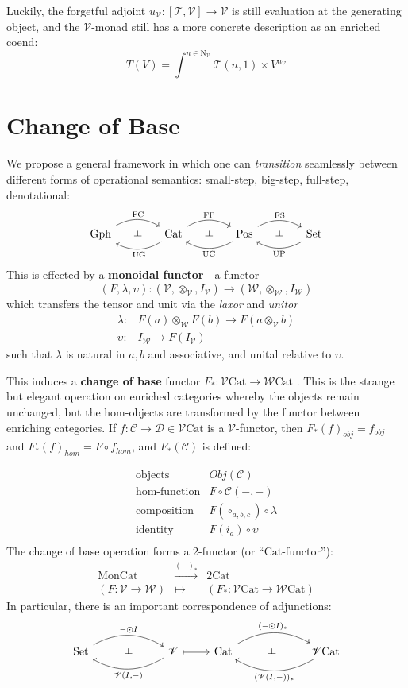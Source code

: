 \documentclass[a4paper,UKenglish]{article}
\theoremstyle{definition}
\def\ld{\rotatebox[origin=c]{-90}{$\dashv$}} %
\newcommand{\Gph}{\mathrm{Gph}}
\newcommand{\Set}{\mathrm{Set}}
\newcommand{\Cat}{\mathrm{Cat}}
\newcommand{\Mon}{\mathrm{Mon}}
\newcommand{\Pos}{\mathrm{Pos}}
\newcommand{\FC}{\mathrm{FC}}
\newcommand{\FP}{\mathrm{FP}}
\newcommand{\FS}{\mathrm{FS}}
\newcommand{\UC}{\mathrm{UC}}
\newcommand{\UP}{\mathrm{UP}}
\newcommand{\UG}{\mathrm{UG}}
\newcommand{\NN}{\mathrm{N}}
\newcommand{\V}{\mathscr{V}}
\newcommand{\W}{\mathscr{W}}
\newcommand{\D}{\mathscr{D}}
\newcommand{\C}{\mathscr{C}}
\newcommand{\T}{\mathscr{T}}
\begin{document}
Luckily, the forgetful adjoint $u_\V: [\T,\V] \to \V$ is still evaluation at the generating object, and the $\V$-monad still has a more concrete description as an enriched coend: $$T(V) = \int^{n\in \NN_\V} \T(n,1) \times V^{n_\V}$$

\section{Change of Base}

We propose a general framework in which one can \textit{transition} seamlessly between different forms of operational semantics: small-step, big-step, full-step, denotational:
\[\begin{tikzcd}[column sep=small]
\Gph \arrow[bend left,below]{rr}{\FC}
& \ld &
\arrow[bend left,above]{ll}{\UG} \Cat \arrow[bend left,below]{rr}{\FP}
& \ld &
\arrow[bend left,above]{ll}{\UC} \Pos \arrow[bend left,below]{rr}{\FS}
& \ld &
\Set \arrow[bend left,above]{ll}{\UP}
\end{tikzcd}\]
This is effected by a \textbf{monoidal functor} - a functor $$(F,\lambda,\upsilon): (\V,\otimes_\V,I_\V) \to (\W,\otimes_\W,I_\W)$$ which transfers the tensor and unit via the \textit{laxor} and \textit{unitor}
\[\begin{array}{rl}
\lambda: & F(a) \otimes_\W F(b) \to F(a\otimes_\V b)\\
\upsilon: & I_\W \to F(I_\V)
\end{array}\]
such that $\lambda$ is natural in $a,b$ and associative, and unital relative to $\upsilon$.

This induces a \textbf{change of base} functor $F_*:\V\Cat \to \W\Cat$ \cite{borceux}. This is the strange but elegant operation on enriched categories whereby the objects remain unchanged, but the hom-objects are transformed by the functor between enriching categories. If $f: \C \to \D \in \V\Cat$ is a $\V$-functor, then $F_*(f)_{obj} = f_{obj}$ and $F_*(f)_{hom} = F\circ f_{hom}$, and $F_*(\C)$ is defined:

\[\begin{array}{rl}
\text{objects} & Obj(\C)\\
\text{hom-function} & F \circ \C(-,-)\\
\text{composition} & F(\circ_{a,b,c}) \circ \lambda\\
\text{identity} & F(i_a) \circ \upsilon\\
\end{array}\]
The change of base operation forms a 2-functor (or ``$\Cat$-functor''):
\[\begin{array}{ccc}
\Mon\Cat & \xrightarrow{(-)_*} & 2\Cat\\
(F: \V\to\W) & \mapsto & (F_*: \V\Cat\to\W\Cat)
\end{array}\]
In particular, there is an important correspondence of adjunctions:
\[\begin{tikzcd}
	\Set \arrow[bend left,below]{rr}{-\odot I}
	& \ld &
	\arrow[bend left,above]{ll}{\V(I,-)} \V
	\arrow[maps to]{r}
	& \Cat \arrow[bend left,below]{rr}{(-\odot I)_*}
	& \ld &
	\arrow[bend left,above]{ll}{(\V(I,-))_*} \V\Cat
\end{tikzcd}\]
\end{document}
